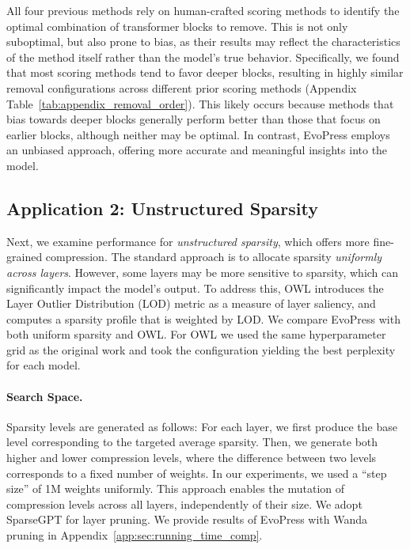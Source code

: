 \documentclass{article}
\theoremstyle{plain}
\theoremstyle{definition}
\theoremstyle{remark}
\newcommand{\methodname}{EvoPress}
\begin{document}
All four previous methods rely on human-crafted scoring methods to identify the optimal combination of transformer blocks to remove. This is not only suboptimal, but also prone to bias, as their results may reflect the characteristics of the method itself rather than the model's true behavior. Specifically, we found that most scoring methods tend to favor deeper blocks, resulting in highly similar removal configurations across different prior scoring methods (Appendix Table~\ref{tab:appendix_removal_order}). This likely occurs because methods that bias towards deeper blocks generally perform better than those that focus on earlier blocks, although neither may be optimal. In contrast, \methodname{} employs an unbiased approach, offering more accurate and meaningful insights into the model. 


\subsection{Application 2: Unstructured Sparsity}\label{subsect:sparsity}


Next, we examine performance for \emph{unstructured sparsity}, which offers more fine-grained compression. The standard approach is to allocate sparsity \emph{uniformly across layers}. However, some layers may be more sensitive to sparsity, which can significantly impact the model's output. To address this, OWL \citep{owl} introduces the Layer Outlier Distribution (LOD) metric as a measure of layer saliency, and computes a sparsity profile that is weighted by LOD. 
We compare \methodname{} with both uniform sparsity and OWL. For OWL we used the same hyperparameter grid as the original work and took the configuration yielding the best perplexity for each model.

\paragraph{Search Space.} 
Sparsity levels are generated as follows: For each layer, we first produce the base level corresponding to the targeted average sparsity. Then, we generate both higher and lower compression levels, where the difference between two levels corresponds to a fixed number of weights. In our experiments, we used a ``step size'' of 1M weights uniformly. This approach enables the mutation of compression levels across all layers, independently of their size. We adopt SparseGPT \citep{frantar2023massive} for layer pruning. We provide results of \methodname{} with Wanda pruning \citep{wanda} in Appendix~\ref{app:sec:running_time_comp}.
\end{document}
